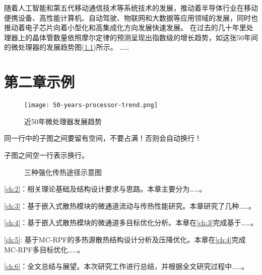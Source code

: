 
随着人工智能和第五代移动通信技术等系统技术的发展\cite{Lau_2022}，推动着半导体行业在移动便携设备、高性能计算机、自动驾驶、物联网和大数据等应用领域的发展\cite{Lau_2022}，同时也推动着电子芯片向着小型化和高集成化方向发展快速发展\cite{Sadique.Murtaza.ea_2022}。
在过去的几十年里处理器上的晶体管数量依照摩尔定律\cite{Tan.Du.ea_2021}的预测呈现出指数级的增长趋势，如这张50年间的微处理器的发展趋势图(\cref{fig:processor-trend})所示。
……

\chapter{第二章示例}
\begin{figure}[htb]
    \texttt{[image: 50-years-processor-trend.png]}
    \caption[处理器发展]{近50年微处理器发展趋势} %
    \label{fig:processor-trend}
\end{figure}


同一行中的子图之间要留有空间，不要占满！否则会自动换行！

子图之间空一行表示换行。

\begin{figure}[htb]

    \caption{三种强化传热途径示意图}
    \label{fig:Three-enhanced-heat-transfer-paths}
\end{figure}



\cref{ch:2}：相关理论基础及结构设计要求与思路。本章主要分为……。

\cref{ch:3}：基于嵌入式散热模块的微通道流动与传热性能研究。本章研究了几种……。

\cref{ch:4}：基于嵌入式散热模块的微通道多目标优化分析。本章在\cref{ch:3}完成基于……。

\cref{ch:5}: 基于MC-RPF的多热源散热结构设计分析及压降优化。本章在\cref{ch:4}完成MC-RPF多目标优化……。

\cref{ch:6}：全文总结与展望。本次研究工作进行总结，并根据全文研究过程中……。


